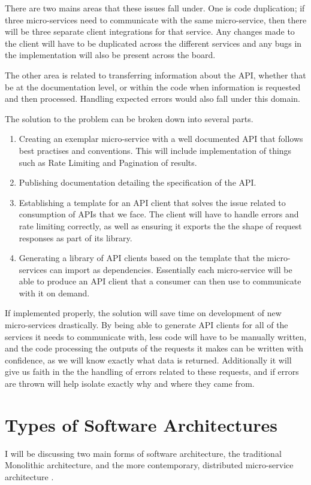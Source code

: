 There are two mains areas that these issues fall under. One is code duplication; if three micro-services need to communicate with the same micro-service, then there will  be three separate client integrations for that service. Any changes made to the client will have to be duplicated across the different services and any bugs in the implementation will also be present across the board. 

The other area is related to transferring information about the API, whether that be at the documentation level, or within the code when information is requested and then processed. Handling expected errors would also fall under this domain.

The solution to the problem can be broken down into several parts.
 \begin{enumerate}
   \item Creating an exemplar micro-service with a well documented API that follows best practises and conventions. This will include implementation of things such as Rate Limiting and Pagination of results.
   \item Publishing documentation detailing the specification of the API.
   \item Establishing a template for an API client that solves the issue related to consumption of APIs that we face. The client will have to handle errors and rate limiting correctly, as well as ensuring it exports the the shape of request responses as part of its library.
   \item Generating a library of API clients based on the template that the micro-services can import as dependencies. Essentially each micro-service will be able to produce an API client that a consumer can then use to communicate with it on demand.
 \end{enumerate}
 
 If implemented properly, the solution will save time on development of new micro-services drastically. By being able to generate API clients for all of the services it needs to communicate with, less code will have to be manually written, and the code processing the outputs of the requests it makes can be written with confidence, as we will know exactly what data is returned. Additionally it will give us faith in the the handling of errors related to these requests, and if errors are thrown will help isolate exactly why and where they came from. 
 
\section{Types of Software Architectures}
I will be discussing two main forms of software architecture, the traditional Monolithic architecture, and the more contemporary, distributed micro-service architecture .

